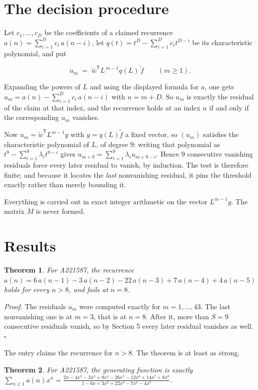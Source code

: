 \documentclass[11pt]{article}
\newtheorem{theorem}{Theorem}
\theoremstyle{definition}
\begin{document}
\section{The decision procedure}

Let $c_1,\dots,c_D$ be the coefficients of a claimed recurrence $a(n) = \sum_{i=1}^{D} c_i\,a(n-i)$, let $q(t) = t^{D} - \sum_{i=1}^{D} c_i t^{D-i}$ be its characteristic polynomial, and put

\[u_m \;=\; \tilde w^{\mathsf T} L^{\,m-1} q(L)\,\tilde f \qquad (m \ge 1).\]

Expanding the powers of $L$ and using the displayed formula for $a$, one gets $u_m = a(n) - \sum_{i=1}^{D} c_i\,a(n-i)$ with $n = m + D$. So $u_m$ is exactly the residual of the claim at that index, and the recurrence holds at an index $n$ if and only if the corresponding $u_m$ vanishes.

Now $u_m = \tilde w^{\mathsf T} L^{m-1} y$ with $y = q(L)\tilde f$ a fixed vector, so $(u_m)$ satisfies the characteristic polynomial of $L$, of degree $9$: writing that polynomial as $t^{9} - \sum_{i=1}^{9} \lambda_i t^{9-i}$ gives $u_{m+9} = \sum_{i=1}^{9} \lambda_i u_{m+9-i}$. Hence $9$ consecutive vanishing residuals force every later residual to vanish, by induction. The test is therefore finite; and because it locates the {\itshape last} nonvanishing residual, it pins the threshold exactly rather than merely bounding it.

Everything is carried out in exact integer arithmetic on the vector $L^{m-1}y$. The matrix $M$ is never formed.

\section{Results}

\begin{theorem} For A221587, the recurrence $a(n) = 6\,a(n-1) - 3\,a(n-2) - 22\,a(n-3) + 7\,a(n-4) + 4\,a(n-5)$ holds for every $n > 8$, and fails at $n = 8$.\end{theorem}

{\itshape Proof.} The residuals $u_m$ were computed exactly for $m = 1,\dots,43$. The last nonvanishing one is at $m = 3$, that is at $n = 8$. After it, more than $S = 9$ consecutive residuals vanish, so by Section 5 every later residual vanishes as well. $\square$

The entry claims the recurrence for $n > 8$. The theorem is at least as strong.

\begin{theorem} For A221587, the generating function is exactly $\sum_{n\ge 1} a(n)x^n = \frac{2x - 4x^{2} - 2x^{3} + 8x^{4} - 26x^{5} - 12x^{6} + 14x^{7} + 8x^{8}}{1 - 6x + 3x^{2} + 22x^{3} - 7x^{4} - 4x^{5}}$.\end{theorem}
\end{document}
